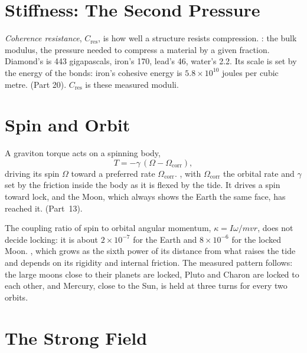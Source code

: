 \documentclass[11pt,a4paper]{article}
\begin{document}
\section{Stiffness: The Second Pressure}
\label{sec:stiffness}

\emph{Coherence resistance}, $C_{\text{res}}$, is how well a structure resists compression. : the bulk modulus, the pressure needed to compress a material by a given fraction. Diamond's is 443 gigapascals, iron's 170, lead's 46, water's 2.2. Its scale is set by the energy of the bonds: iron's cohesive energy is $5.8\times10^{10}$ joules per cubic metre.  (Part 20). $C_{\text{res}}$ is these measured moduli.

\section{Spin and Orbit}
\label{sec:spin}

A graviton torque acts on a spinning body,
\begin{equation}
T = -\gamma\,(\Omega - \Omega_{\text{corr}}),
\label{eq:torque}
\end{equation}
driving its spin $\Omega$ toward a preferred rate $\Omega_{\text{corr}}$. , with $\Omega_{\text{corr}}$ the orbital rate and $\gamma$ set by the friction inside the body as it is flexed by the tide. It drives a spin toward lock, and the Moon, which always shows the Earth the same face, has reached it.  (Part~13).

The coupling ratio of spin to orbital angular momentum, $\kappa = I\omega/mvr$, does not decide locking: it is about $2\times10^{-7}$ for the Earth and $8\times10^{-6}$ for the locked Moon. , which grows as the sixth power of its distance from what raises the tide and depends on its rigidity and internal friction. The measured pattern follows: the large moons close to their planets are locked, Pluto and Charon are locked to each other, and Mercury, close to the Sun, is held at three turns for every two orbits.

\section{The Strong Field}
\label{sec:strong}
\end{document}
